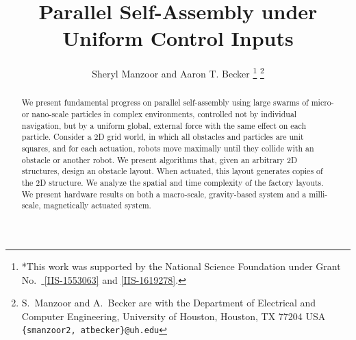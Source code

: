 \documentclass[letterpaper, 10 pt, conference]{ieeeconf}
\begin{document}
\tableofcontents
\setcounter{tocdepth}{3}
\newpage
\mbox{}
\newpage

\title{\LARGE \bf 
Parallel Self-Assembly under Uniform Control Inputs 
}
\author{Sheryl Manzoor and Aaron T. Becker%
\thanks{*This work was supported by the National Science Foundation under Grant No.\ \href{http://nsf.gov/awardsearch/showAward?AWD_ID=1553063}{ [IIS-1553063]} and \href{http://nsf.gov/awardsearch/showAward?AWD_ID=1619278}{[IIS-1619278]}.}%
\thanks{S.~Manzoor and A.~Becker are with the Department of Electrical and Computer Engineering,  University of Houston, Houston, TX 77204 USA        {\tt\small  \{smanzoor2, atbecker\}@uh.edu}}%
}
\maketitle


\begin{abstract} 
We present fundamental progress on parallel self-assembly using large swarms of micro- or nano-scale particles
in complex environments, controlled not by individual navigation, but by a uniform global, external force with the same effect on each particle.
Consider a 2D grid world, in which all obstacles and particles are unit squares,
and for each actuation, robots move maximally until they collide with an obstacle or another robot. 
We present algorithms that, given an  arbitrary 2D structures, design an obstacle layout.
 When actuated, this layout generates copies of the 2D structure.
We analyze the spatial and time complexity of the factory layouts. 
We present hardware results on both a macro-scale, gravity-based system and a milli-scale, magnetically actuated system.








\end{abstract}










\end{document}

